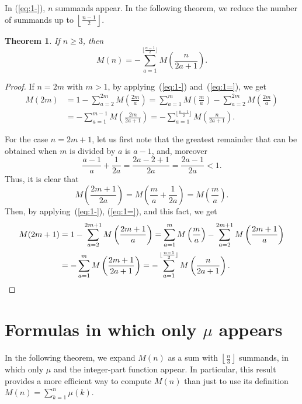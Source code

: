 \documentclass[10pt]{amsart}
\newtheorem{theor}{Theorem}
\begin{document}
In (\ref{eq:1-}), $n$ summands appear. In the following
theorem, we reduce the number of summands up to
$\left\lfloor \frac {n-1}2\right\rfloor$.

\begin{theor}
\label{th:Ma}
If $n\geq 3$, then
\begin{equation}
\label{eq:Ma}
M(n) = -\sum_{a=1}^{\lfloor\frac{n-1}2\rfloor} M\left(\frac {n}{2a+1}\right).
\end{equation}
\end{theor}

\begin{proof}
If $n=2m$ with $m>1$, by applying~(\ref{eq:1-}) and~(\ref{eq:1=}),
we get
\begin{align*}
M(2m) &= 1-\sum_{a=2}^{2m} M\left(\frac {2m}{a}\right)
= \sum_{a=1}^{m} M\left(\frac {m}{a}\right)-\sum_{a=2}^{2m} M\left(\frac {2m}{a}\right) \\
&= -\sum_{a=1}^{m-1} M\left(\frac {2m}{2a+1}\right)
= -\sum_{a=1}^{\lfloor\frac{n-1}2\rfloor} M\left(\frac {n}{2a+1}\right).
\end{align*}

For the case $n=2m+1$, let us first note that the greatest remainder 
that can be obtained when $m$ is divided by $a$ is $a-1$, and, moreover
$$
\frac{a-1}a + \frac 1{2a} = \frac{2a-2+1}{2a} = \frac{2a-1}{2a} < 1.
$$
Thus, it is clear that
$$
M\left(\frac{2m+1}{2a}\right)
= M\left(\frac ma + \frac 1{2a}\right)
= M\left(\frac{m}{a}\right).
$$
Then, by applying~(\ref{eq:1-}), (\ref{eq:1=}), and this fact, we get
\begin{align*}
M(2m+1) &= 1-\sum_{a=2}^{2m+1} M\left(\frac {2m+1}{a}\right) %
= \sum_{a=1}^{m} M\left(\frac {m}{a}\right)
- \sum_{a=2}^{2m+1} M\left(\frac {2m+1}{a}\right) \\
&= -\sum_{a=1}^{m} M\left(\frac {2m+1}{2a+1}\right)
= -\sum_{a=1}^{\lfloor\frac{n-1}2\rfloor} M\left(\frac {n}{2a+1}\right).
\qedhere
\end{align*}
\end{proof}

\section{Formulas in which only $\mu$ appears}
\label{sec:mu}

In the following theorem, we expand $M(n)$ as a sum with
$\left\lfloor\frac{n}3\right\rfloor$
summands, in which only $\mu$ and the integer-part function appear.
In particular, this result provides a more efficient way to
compute $M(n)$ than just to use its definition
$M(n) = \sum_{k=1}^n \mu(k)$.
\end{document}

